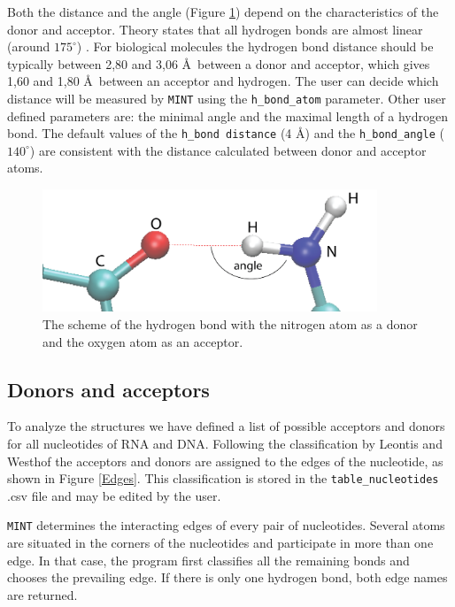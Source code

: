 \documentclass[12pt]{article}
\begin{document}
Both the distance and the angle (Figure \ref{hbond}) depend on the characteristics of the donor and acceptor. Theory states that all hydrogen bonds are almost linear (around $175^\circ$) \cite{Guerra2000}. For biological molecules the hydrogen bond distance should be typically between 2,80 and 3,06 \AA\ between a donor and acceptor, which gives 1,60 and 1,80 \AA\ between an acceptor and hydrogen. The user can decide which distance will be measured by {\tt MINT} using the \texttt{h\_bond\_atom} parameter.
Other user defined parameters are: the minimal angle and the maximal length of a hydrogen bond. The default values of the \texttt{h\_bond distance} (4 \AA) and the \texttt{h\_bond\_angle} ($140^\circ$) are consistent with the distance calculated between donor and acceptor atoms. 

\begin{figure}[h!]
\centering
\includegraphics[width = 10cm]{./pictures/hydrogen_bond_2.png}
\caption{The scheme of the hydrogen bond with the nitrogen atom as a donor and the oxygen atom as an acceptor.}
\label{hbond}
\end{figure}

\subsection{Donors and acceptors}
\label{donrsandacceptors}
To analyze the structures we have defined a list of possible acceptors and donors for all nucleotides of RNA and DNA. Following the classification by Leontis and Westhof \cite{Leontis2002} the acceptors and donors are assigned to the edges of the nucleotide, as shown in Figure \ref{Edges}. This classification is stored in the {\tt table\_nucleotides} .csv file and may be edited by the user. 

{\tt MINT} determines the interacting edges of every pair of nucleotides. Several atoms are situated in the corners of the nucleotides and participate in more than one edge. In that case, the program first classifies all the remaining bonds and chooses the prevailing edge. If there is only one hydrogen bond, both edge names are returned. 
\end{document}
